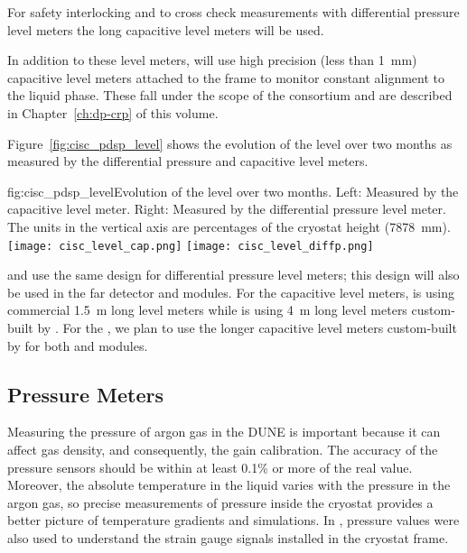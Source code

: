 For %
safety interlocking and to cross check measurements with differential pressure level meters the long capacitive level meters will be used. 


In addition to these level meters,  will use high precision (less than \SI{1}{mm}) capacitive level meters attached to the  frame to monitor constant  alignment to the liquid phase. These fall under the scope of the  consortium and are described in Chapter~\ref{ch:dp-crp} of this  volume.

Figure~\ref{fig:cisc_pdsp_level} shows the evolution of the   level over two months as measured by the differential pressure and capacitive level meters. 

\begin{dunefigure}{fig:cisc_pdsp_level}{Evolution of the  \lar level over two months. Left: Measured by the capacitive level meter. Right: Measured by the differential pressure level meter. The units in the vertical axis are percentages of the cryostat height (\SI{7878}{mm}).}
  \texttt{[image: cisc\_level\_cap.png]}%
  \hspace*{1cm}
  \texttt{[image: cisc\_level\_diffp.png]}%
\end{dunefigure}

 and  use the same design for differential pressure level meters; this design  will also be used in the far detector  and  modules. For the capacitive level meters,  is using commercial  \SI{1.5}{m} long level meters while  is using \SI{4}{m} long level meters custom-built by . For the  , we plan to use the longer capacitive level meters custom-built by  for both  and  modules.



\subsection{Pressure Meters}
\label{sec:fdgen-slow-cryo-press-meter}


Measuring the pressure of argon gas in the DUNE  is important because it can affect gas density, and consequently, the  gain calibration. The accuracy of the pressure sensors should be within at least 0.1\% or more of the real value. %
Moreover, the absolute temperature in the liquid varies with the pressure in the argon gas, so precise measurements of pressure inside the cryostat provides a better picture of temperature gradients and  simulations. In , pressure values were also used to understand the strain gauge signals installed in the cryostat frame.

